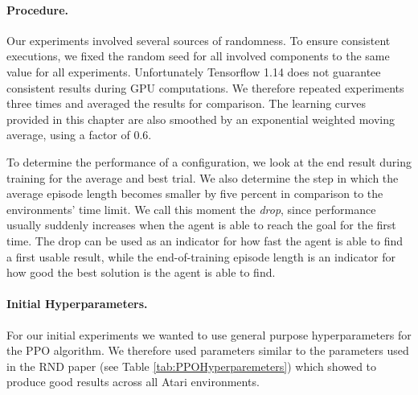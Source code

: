 \paragraph{Procedure.}
Our experiments involved several sources of randomness. To ensure consistent executions, we fixed the random seed for all involved components to the same value for all experiments. Unfortunately Tensorflow 1.14 does not guarantee consistent results during GPU computations. We therefore repeated experiments three times and averaged the results for comparison. The learning curves provided in this chapter are also smoothed by an exponential weighted moving average, using a factor of $0.6$.

To determine the performance of a configuration, we look at the end result during training for the average and best trial. We also determine the step in which the average episode length becomes smaller by five percent in comparison to the environments' time limit. We call this moment the \textit{drop}, since performance usually suddenly increases when the agent is able to reach the goal for the first time. The drop can be used as an indicator for how fast the agent is able to find a first usable result, while the end-of-training episode length is an indicator for how good the best solution is the agent is able to find. 

\paragraph{Initial Hyperparameters.}
For our initial experiments we wanted to use general purpose hyperparameters for the PPO algorithm. We therefore used parameters similar to the parameters used in the RND paper \cite{burda2018exploration} (see Table \ref{tab:PPOHyperparemeters}) which showed to produce good results across all Atari environments. 


